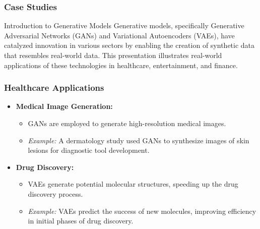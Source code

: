 \documentclass[aspectratio=169]{beamer}
\begin{document}
\begin{frame}[fragile]
    \frametitle{Case Studies}
    \begin{block}{Introduction to Generative Models}
        Generative models, specifically Generative Adversarial Networks (GANs) and Variational Autoencoders (VAEs), have catalyzed innovation in various sectors by enabling the creation of synthetic data that resembles real-world data. This presentation illustrates real-world applications of these technologies in healthcare, entertainment, and finance.
    \end{block}
\end{frame}

\begin{frame}[fragile]
    \frametitle{Healthcare Applications}
    \begin{itemize}
        \item \textbf{Medical Image Generation:}
        \begin{itemize}
            \item GANs are employed to generate high-resolution medical images.
            \item \textit{Example:} A dermatology study used GANs to synthesize images of skin lesions for diagnostic tool development.
        \end{itemize}

        \item \textbf{Drug Discovery:}
        \begin{itemize}
            \item VAEs generate potential molecular structures, speeding up the drug discovery process.
            \item \textit{Example:} VAEs predict the success of new molecules, improving efficiency in initial phases of drug discovery.
        \end{itemize}
    \end{itemize}
\end{frame}
\end{document}
